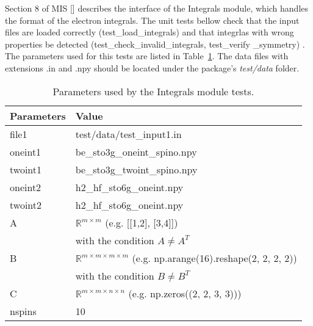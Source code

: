 \documentclass[12pt, titlepage]{article}
\begin{document}
Section 8 of MIS [\cite{MIS2020}] describes the interface of the Integrals 
module, which handles the format of the electron integrals. The unit tests 
bellow check that the input files are loaded correctly (test\_load\_integrals) 
and that integrlas with wrong properties be detected 
(test\_check\_invalid\_integrals, test\_verify \_symmetry) . The parameters 
used for this tests are listed in Table~\ref{table:intdata}.
The data files with extensions .in and .npy should be located under the 
package's \textit{test/data} folder.
\begin{table}[h!]
	\centering
	\begin{tabular}{ll}
		Parameters& Value\\
		\midrule 
		file1 & test/data/test\_input1.in\\
		oneint1 & be\_sto3g\_oneint\_spino.npy\\
		twoint1 & be\_sto3g\_twoint\_spino.npy\\
		oneint2 & h2\_hf\_sto6g\_oneint.npy\\
		twoint2 & h2\_hf\_sto6g\_oneint.npy\\
		A &$\mathbb{R}^{m \times m}$ (e.g. [[1,2], [3,4]])\\
		 &with the condition $A \not= A^{T}$\\
		B &$\mathbb{R}^{m \times m \times m \times m}$ (e.g. 
		np.arange(16).reshape(2, 
		2, 2, 2))\\
		&with the condition $B \not= B^{T}$\\
		C &$\mathbb{R}^{m \times m \times n \times n}$ (e.g. 
		np.zeros((2, 2, 3, 3)))\\
		nspins&10\\
		\bottomrule
	\end{tabular}
	\caption{Parameters used by the Integrals module tests.}
	\label{table:intdata}
\end{table} 
\end{document}
